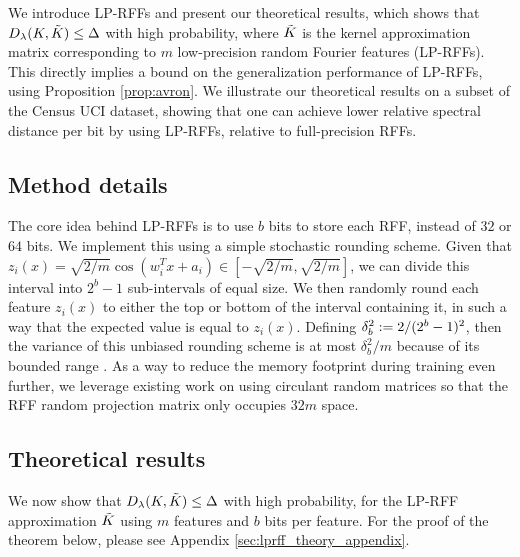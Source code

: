 We introduce LP-RFFs and present our theoretical results, which shows that $D_{\lambda}(K,\tilde{K}) \leq \Delta$ with high probability, where $\tilde{K}$ is the kernel approximation matrix corresponding to $m$ low-precision random Fourier features (LP-RFFs). This directly implies a bound on the generalization performance of LP-RFFs, using Proposition \ref{prop:avron}. We illustrate our theoretical results on a subset of the Census UCI dataset, showing that one can achieve lower relative spectral distance per bit by using LP-RFFs, relative to full-precision RFFs. \vsp

\subsection{Method details}
\label{subsec:method_details}
The core idea behind LP-RFFs is to use $b$ bits to store each RFF, instead of $32$ or $64$ bits. We implement this using a simple stochastic rounding scheme. Given that $z_i(x) = \sqrt{2/m}\cos(w_i^T x + a_i) \in [-\sqrt{2/m},\sqrt{2/m}]$, we can divide this interval into $2^b - 1$ sub-intervals of equal size. We then randomly round each feature $z_i(x)$ to either the top or bottom of the interval containing it, in such a way that the expected value is equal to $z_i(x)$. Defining $\delta_b^2 := 2/(2^b-1)^2$, then the variance of this unbiased rounding scheme is at most $\delta_b^2/m$ because of its bounded range \cite{popoviciu1935equations}.  As a way to reduce the memory footprint during training even further, we leverage existing work on using circulant random matrices \citep{yu15} so that the RFF random projection matrix only occupies $32m$ space. \vsp

\subsection{Theoretical results}

We now show that $D_{\lambda}(K,\tilde{K}) \leq \Delta$ with high probability, for the LP-RFF approximation $\tilde{K}$ using $m$ features and $b$ bits per feature.  For the proof of the theorem below, please see Appendix \ref{sec:lprff_theory_appendix}.

